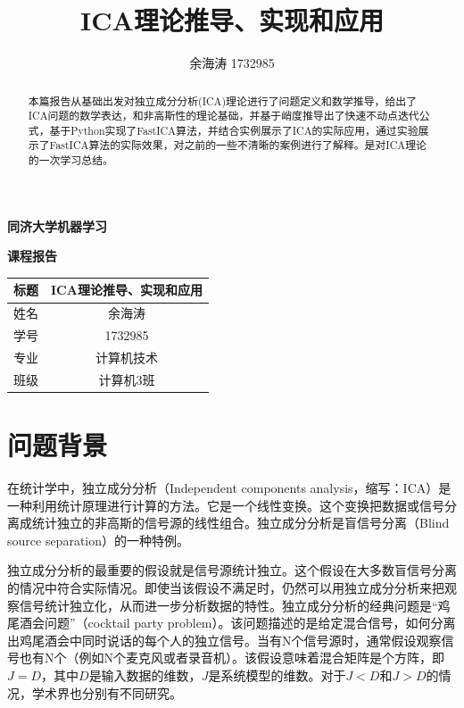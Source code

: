 \documentclass[UTF8,zihao=5,a4paper]{ctexart}
\title{ICA理论推导、实现和应用}
\author{余海涛 1732985}
\date{}
\begin{document}
    
\begin{titlepage}
    \vspace*{6cm}
    \Huge
    \begin{center}
        \textbf{同济大学机器学习}
        
        \textbf{课程报告}
    \end{center}
    \vspace{3cm}
    \begin{table}[h]
        \Large
        \centering
        \begin{tabular}{|l|c|}
        \hline
        标题 & ICA理论推导、实现和应用\\
        \hline
        姓名 & 余海涛 \\
        \hline
        学号 & 1732985\\        
        \hline
        专业 & 计算机技术\\
        \hline
        班级 & 计算机3班\\
        \hline
        \end{tabular}
    \end{table}
\end{titlepage}

\maketitle

\begin{abstract}
    本篇报告从基础出发对独立成分分析(ICA)理论进行了问题定义和数学推导，给出了ICA问题的数学表达，和非高斯性的理论基础，并基于峭度推导出了快速不动点迭代公式，基于Python实现了FastICA算法，并结合实例展示了ICA的实际应用，通过实验展示了FastICA算法的实际效果，对之前的一些不清晰的案例进行了解释。是对ICA理论的一次学习总结。
\end{abstract}


\section{问题背景}
在统计学中，独立成分分析\cite{icawikipedia,ica,icachinese}（Independent components analysis，缩写：ICA）是一种利用统计原理进行计算的方法。它是一个线性变换。这个变换把数据或信号分离成统计独立的非高斯的信号源的线性组合。独立成分分析是盲信号分离（Blind source separation）的一种特例。

独立成分分析的最重要的假设就是信号源统计独立。这个假设在大多数盲信号分离的情况中符合实际情况。即使当该假设不满足时，仍然可以用独立成分分析来把观察信号统计独立化，从而进一步分析数据的特性。独立成分分析的经典问题是“鸡尾酒会问题”（cocktail party problem）。该问题描述的是给定混合信号，如何分离出鸡尾酒会中同时说话的每个人的独立信号。当有N个信号源时，通常假设观察信号也有N个（例如N个麦克风或者录音机）。该假设意味着混合矩阵是个方阵，即$J = D$，其中$D$是输入数据的维数，$J$是系统模型的维数。对于$J < D$和$J > D$的情况，学术界也分别有不同研究。
\end{document}
